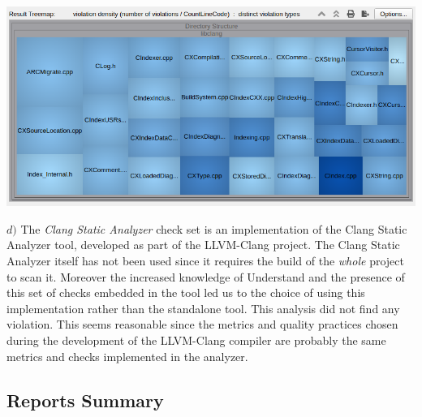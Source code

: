 \begin{minipage}{\linewidth}
	\includegraphics[width=\textwidth]{img/AllChecksViolationsRatio.png}
\end{minipage}
\pagebreak

\hspace{-0.6cm} \textbf{$d)$}  
The \textsl{Clang Static Analyzer} check set is an implementation of the Clang Static Analyzer tool, developed as part of the LLVM-Clang project.\newline
The Clang Static Analyzer itself has not been used since it requires the build of the \textsl{whole} project to scan it. Moreover the increased knowledge of Understand and the presence of this set of checks embedded in the tool led us to the choice of using this implementation rather than the standalone tool.\newline\newline
This analysis did not find any violation. This seems reasonable since the metrics and quality practices chosen during the development of the LLVM-Clang compiler are probably the same metrics and checks implemented in the analyzer.

\subsection{Reports Summary}

